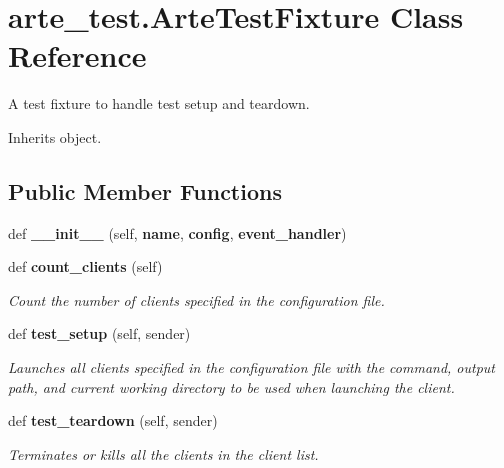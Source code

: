 \section{arte\+\_\+test.\+Arte\+Test\+Fixture Class Reference}
\label{classarte__test_1_1_arte_test_fixture}


A test fixture to handle test setup and teardown.  




Inherits object.

\subsection*{Public Member Functions}
\begin{DoxyCompactItemize}
\item 
def {\bfseries \+\_\+\+\_\+init\+\_\+\+\_\+} (self, {\bf name}, {\bf config}, {\bf event\+\_\+handler})\label{classarte__test_1_1_arte_test_fixture_a619a89b940d44328e2625532f29275f9}

\item 
def {\bf count\+\_\+clients} (self)
\begin{DoxyCompactList}\small\item\em Count the number of clients specified in the configuration file. \end{DoxyCompactList}\item 
def {\bf test\+\_\+setup} (self, sender)\label{classarte__test_1_1_arte_test_fixture_abc57d7ecb680c0d4c46c8bea1f2c9001}

\begin{DoxyCompactList}\small\item\em Launches all clients specified in the configuration file with the command, output path, and current working directory to be used when launching the client. \end{DoxyCompactList}\item 
def {\bf test\+\_\+teardown} (self, sender)
\begin{DoxyCompactList}\small\item\em Terminates or kills all the clients in the client list. \end{DoxyCompactList}\end{DoxyCompactItemize}
